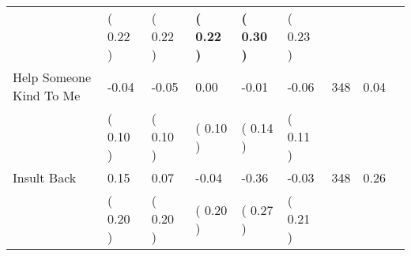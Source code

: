 \begin{tabular}{L{6.2cm} C{1.8cm} C{1.8cm} C{1.8cm} C{1.8cm} C{1.8cm} C{1.8cm} C{0.3cm} C{0.3cm}}
 & (     0.22 ) & (     0.22 ) & \textbf{(     0.22 )} & \textbf{(     0.30 )} & (     0.23 )  & \\
Help Someone Kind To Me &     -0.04 &     -0.05 &      0.00 &     -0.01 &     -0.06  & 348 &       0.04 \\ 
 & (     0.10 ) & (     0.10 ) & (     0.10 ) & (     0.14 ) & (     0.11 )  & \\
Insult Back &      0.15 &      0.07 &     -0.04 &     -0.36 &     -0.03  & 348 &       0.26 \\ 
 & (     0.20 ) & (     0.20 ) & (     0.20 ) & (     0.27 ) & (     0.21 )  & \\
\bottomrule
\end{tabular}
